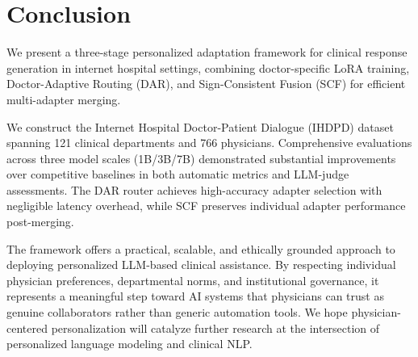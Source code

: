 
\section{Conclusion}

We present a three-stage personalized adaptation framework for clinical response generation in internet hospital settings, combining doctor-specific LoRA training, Doctor-Adaptive Routing (DAR), and Sign-Consistent Fusion (SCF) for efficient multi-adapter merging.

We construct the Internet Hospital Doctor-Patient Dialogue (IHDPD) dataset spanning 121 clinical departments and 766 physicians. Comprehensive evaluations across three model scales (1B/3B/7B) demonstrated substantial improvements over competitive baselines in both automatic metrics and LLM-judge assessments. The DAR router achieves high-accuracy adapter selection with negligible latency overhead, while SCF preserves individual adapter performance post-merging.

The framework offers a practical, scalable, and ethically grounded approach to deploying personalized LLM-based clinical assistance. By respecting individual physician preferences, departmental norms, and institutional governance, it represents a meaningful step toward AI systems that physicians can trust as genuine collaborators rather than generic automation tools. We hope physician-centered personalization will catalyze further research at the intersection of personalized language modeling and clinical NLP.
